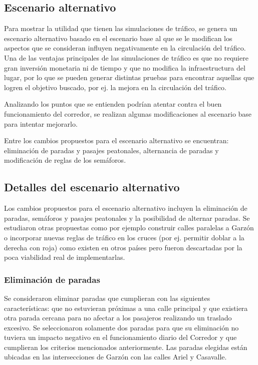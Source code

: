 \subsection{Escenario alternativo}

Para mostrar la utilidad que tienen las simulaciones de tráfico, se genera un escenario alternativo basado en el escenario base al que se le modifican los aspectos que se consideran influyen negativamente en la circulación del tráfico. Una de las ventajas principales de las simulaciones de tráfico es que no requiere gran inversión monetaria ni de tiempo y que no modifica la infraestructura del lugar, por lo que se pueden generar distintas pruebas para encontrar aquellas que logren el objetivo buscado, por ej. la mejora en la circulación del tráfico.

Analizando los puntos que se entienden podrían atentar contra el buen funcionamiento del corredor, se realizan algunas modificaciones al escenario base para intentar mejorarlo. 

Entre los cambios propuestos para el escenario alternativo se encuentran: eliminación de paradas y pasajes peatonales, alternancia de paradas y modificación de reglas de los semáforos.

\subsection{Detalles del escenario alternativo}
Los cambios propuestos para el escenario alternativo incluyen la eliminación de paradas, semáforos y pasajes peatonales y la posibilidad de alternar paradas. Se estudiaron otras propuestas como por ejemplo construir calles paralelas a Garzón o incorporar nuevas reglas de tráfico en los cruces (por ej. permitir doblar a la derecha con roja) como existen en otros países pero fueron descartadas por la poca viabilidad real de implementarlas.

\subsubsection{Eliminación de paradas}
Se consideraron eliminar paradas que cumplieran con las siguientes características: que no estuvieran próximas a una calle principal y que existiera otra parada cercana para no afectar a los pasajeros realizando un traslado excesivo.  Se seleccionaron solamente dos paradas para que su eliminación no tuviera un impacto negativo en el funcionamiento diario del Corredor y que cumplieran los criterios mencionados anteriormente. Las paradas elegidas están ubicadas en las intersecciones de Garzón con las calles Ariel y Casavalle.

